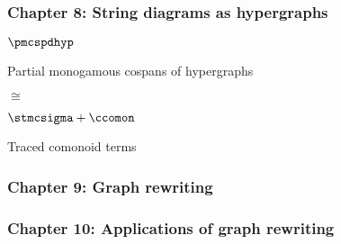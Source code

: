 \begin{frame}
    \frametitle{Chapter 8: String diagrams as hypergraphs}

    \begin{center}
        \begin{minipage}{0.4\textwidth}
            \centering
            \LARGE
            \(\pmcspdhyp\)

            \Large
            Partial monogamous cospans of hypergraphs

            \vspace{0.5em}

        \end{minipage}
        \qquad
        {\LARGE \(\cong\)}
        \begin{minipage}{0.4\textwidth}
            \centering
            \LARGE
            \(\stmcsigma + \ccomon\)

            \Large
            Traced comonoid terms

            \vspace{1em}

            \normalsize
        \end{minipage}
    \end{center}



\end{frame}

\begin{frame}
    \frametitle{Chapter 9: Graph rewriting}



\end{frame}

\begin{frame}
    \frametitle{Chapter 10: Applications of graph rewriting}



\end{frame}

